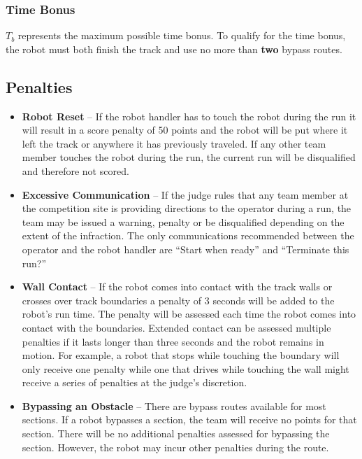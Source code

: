 \subsubsection{Time Bonus}
$T_b$ represents the maximum possible time bonus. To qualify for the time bonus, the robot must both finish the track and use no more than \textbf{two} bypass routes.

\subsection{Penalties}
\begin{itemize}
\item \textbf{Robot Reset} – If the robot handler has to touch the robot during the run it will result in a score penalty of 50 points and the robot will be put where it left the track or anywhere it has previously traveled. If any other team member touches the robot during the run, the current run will be disqualified and therefore not scored.
\item \textbf{Excessive Communication} – If the judge rules that any team member at the competition site is providing directions to the operator during a run, the team may be issued a warning, penalty or be disqualified depending on the extent of the infraction. The only communications recommended between the operator and the robot handler are “Start when ready” and “Terminate this run?” 
\item  \textbf{Wall Contact}\label{Wall Contact} – If the robot comes into contact with the track walls or crosses over track boundaries a penalty of 3 seconds will be added to the robot's run time. The penalty will be assessed each time the robot comes into contact with the boundaries. Extended contact can be assessed multiple penalties if it lasts longer than three seconds and the robot remains in motion. For example, a robot that stops while touching the boundary will only receive one penalty while one that drives while touching the wall might receive a series of penalties at the judge’s discretion.
\item \textbf{Bypassing an Obstacle}\label{bypass} -- There are bypass routes available for most sections. If a robot bypasses a section, the team will receive no points for that section. There will be no additional penalties assessed for bypassing the section. However, the robot may incur other penalties during the route.  
\end{itemize}


